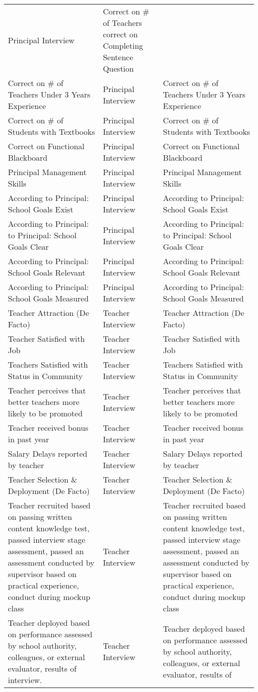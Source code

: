 \documentclass[]{article}
\begin{document}
\begin{longtable}[]{@{}lll@{}}
Principal Interview & Correct on \# of Teachers correct on Completing
Sentence Question\tabularnewline
Correct on \# of Teachers Under 3 Years Experience & Principal Interview
& Correct on \# of Teachers Under 3 Years Experience\tabularnewline
Correct on \# of Students with Textbooks & Principal Interview & Correct
on \# of Students with Textbooks\tabularnewline
Correct on Functional Blackboard & Principal Interview & Correct on
Functional Blackboard\tabularnewline
Principal Management Skills & Principal Interview & Principal Management
Skills\tabularnewline
According to Principal: School Goals Exist & Principal Interview &
According to Principal: School Goals Exist\tabularnewline
According to Principal: to Principal: School Goals Clear & Principal
Interview & According to Principal: to Principal: School Goals
Clear\tabularnewline
According to Principal: School Goals Relevant & Principal Interview &
According to Principal: School Goals Relevant\tabularnewline
According to Principal: School Goals Measured & Principal Interview &
According to Principal: School Goals Measured\tabularnewline
Teacher Attraction (De Facto) & Teacher Interview & Teacher Attraction
(De Facto)\tabularnewline
Teacher Satisfied with Job & Teacher Interview & Teacher Satisfied with
Job\tabularnewline
Teachers Satisfied with Status in Community & Teacher Interview &
Teachers Satisfied with Status in Community\tabularnewline
Teacher perceives that better teachers more likely to be promoted &
Teacher Interview & Teacher perceives that better teachers more likely
to be promoted\tabularnewline
Teacher received bonus in past year & Teacher Interview & Teacher
received bonus in past year\tabularnewline
Salary Delays reported by teacher & Teacher Interview & Salary Delays
reported by teacher\tabularnewline
Teacher Selection \& Deployment (De Facto) & Teacher Interview & Teacher
Selection \& Deployment (De Facto)\tabularnewline
Teacher recruited based on passing written content knowledge test,
passed interview stage assessment, passed an assessment conducted by
supervisor based on practical experience, conduct during mockup class &
Teacher Interview & Teacher recruited based on passing written content
knowledge test, passed interview stage assessment, passed an assessment
conducted by supervisor based on practical experience, conduct during
mockup class\tabularnewline
Teacher deployed based on performance assessed by school authority,
colleagues, or external evaluator, results of interview. & Teacher
Interview & Teacher deployed based on performance assessed by school
authority, colleagues, or external evaluator, results of

\end{longtable}
\end{document}
